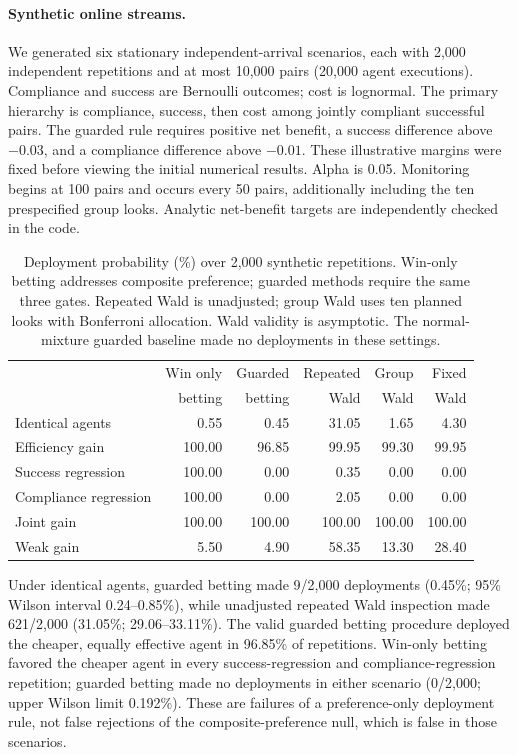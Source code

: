 \paragraph{Synthetic online streams.}
We generated six stationary independent-arrival scenarios, each with
2,000 independent repetitions and at most 10,000 pairs (20,000 agent
executions). Compliance and success are Bernoulli outcomes; cost is
lognormal. The primary hierarchy is compliance, success, then cost among
jointly compliant successful pairs. The guarded rule requires positive
net benefit, a success difference above $-0.03$, and a compliance
difference above $-0.01$. These illustrative margins were fixed before
viewing the initial numerical results. Alpha is 0.05. Monitoring begins
at 100 pairs and occurs every 50 pairs, additionally including the ten
prespecified group looks. Analytic net-benefit targets are independently
checked in the code.

\begin{table}[t]
\centering\small
\caption{Deployment probability (\%) over 2,000 synthetic repetitions.
Win-only betting addresses composite preference; guarded methods require
the same three gates. Repeated Wald is unadjusted; group Wald uses ten
planned looks with Bonferroni allocation. Wald validity is asymptotic.
The normal-mixture guarded baseline made no deployments in these settings.}
\label{tab:simulation}
\begin{tabular}{lrrrrr}\toprule
 & Win only & Guarded & Repeated & Group & Fixed\\
 & betting & betting & Wald & Wald & Wald\\\midrule
Identical agents & 0.55 & 0.45 & 31.05 & 1.65 & 4.30 \\
Efficiency gain & 100.00 & 96.85 & 99.95 & 99.30 & 99.95 \\
Success regression & 100.00 & 0.00 & 0.35 & 0.00 & 0.00 \\
Compliance regression & 100.00 & 0.00 & 2.05 & 0.00 & 0.00 \\
Joint gain & 100.00 & 100.00 & 100.00 & 100.00 & 100.00 \\
Weak gain & 5.50 & 4.90 & 58.35 & 13.30 & 28.40 \\
\bottomrule\end{tabular}
\end{table}

Under identical agents, guarded betting made 9/2,000 deployments
(0.45\%; 95\% Wilson interval 0.24--0.85\%), while unadjusted repeated
Wald inspection made 621/2,000 (31.05\%; 29.06--33.11\%). The valid
guarded betting procedure deployed the cheaper, equally effective agent
in 96.85\% of repetitions. Win-only betting favored the cheaper agent in
every success-regression and compliance-regression repetition; guarded
betting made no deployments in either scenario (0/2,000; upper Wilson
limit 0.192\%). These are failures of a preference-only deployment rule,
not false rejections of the composite-preference null, which is false
in those scenarios.

